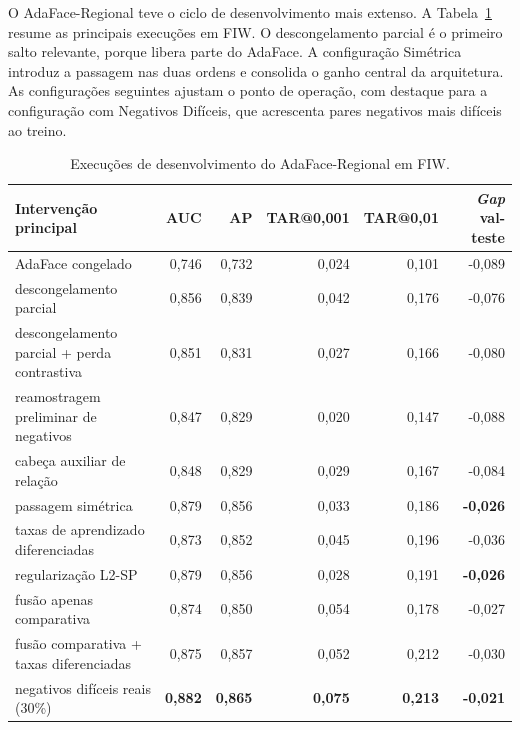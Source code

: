 O AdaFace-Regional teve o ciclo de desenvolvimento mais extenso. A Tabela~\ref{tab:adaface_regional_execucoes} resume as principais execuções em FIW. O descongelamento parcial é o primeiro salto relevante, porque libera parte do AdaFace. A configuração Simétrica introduz a passagem nas duas ordens e consolida o ganho central da arquitetura. As configurações seguintes ajustam o ponto de operação, com destaque para a configuração com Negativos Difíceis, que acrescenta pares negativos mais difíceis ao treino.

\begin{table}[htbp]
\centering
\scriptsize
\setlength{\tabcolsep}{3pt}
\caption{Execuções de desenvolvimento do AdaFace-Regional em FIW.}
\label{tab:adaface_regional_execucoes}
\begin{tabularx}{\textwidth}{Xrrrrr}
\hline
\textbf{Intervenção principal} & \textbf{AUC} & \textbf{AP} & \textbf{TAR@0{,}001} & \textbf{TAR@0{,}01} & \textbf{\textit{Gap} val-teste} \\
\hline
AdaFace congelado               & 0{,}746 & 0{,}732 & 0{,}024 & 0{,}101 & -0{,}089 \\
descongelamento parcial          & 0{,}856 & 0{,}839 & 0{,}042 & 0{,}176 & -0{,}076 \\
descongelamento parcial + perda contrastiva & 0{,}851 & 0{,}831 & 0{,}027 & 0{,}166 & -0{,}080 \\
reamostragem preliminar de negativos & 0{,}847 & 0{,}829 & 0{,}020 & 0{,}147 & -0{,}088 \\
cabeça auxiliar de relação       & 0{,}848 & 0{,}829 & 0{,}029 & 0{,}167 & -0{,}084 \\
passagem simétrica               & 0{,}879 & 0{,}856 & 0{,}033 & 0{,}186 & \textbf{-0{,}026} \\
taxas de aprendizado diferenciadas & 0{,}873 & 0{,}852 & 0{,}045 & 0{,}196 & -0{,}036 \\
regularização L2-SP              & 0{,}879 & 0{,}856 & 0{,}028 & 0{,}191 & \textbf{-0{,}026} \\
fusão apenas comparativa         & 0{,}874 & 0{,}850 & 0{,}054 & 0{,}178 & -0{,}027 \\
fusão comparativa + taxas diferenciadas & 0{,}875 & 0{,}857 & 0{,}052 & 0{,}212 & -0{,}030 \\
negativos difíceis reais (30\%)  & \textbf{0{,}882} & \textbf{0{,}865} & \textbf{0{,}075} & \textbf{0{,}213} & \textbf{-0{,}021} \\
\hline
\end{tabularx}
\end{table}

